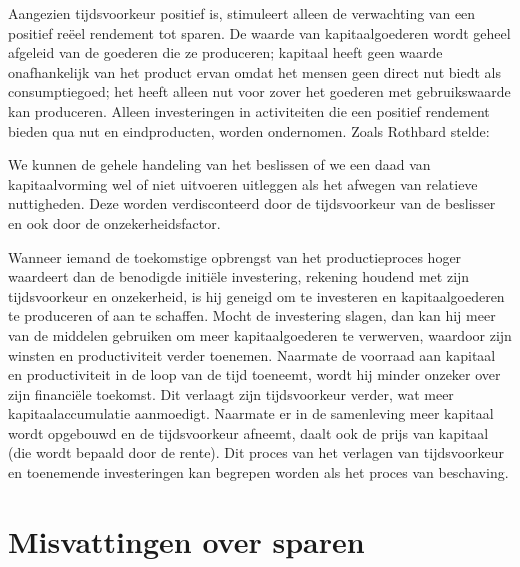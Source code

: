 Aangezien tijdsvoorkeur positief is, stimuleert alleen de verwachting van een positief reëel rendement tot sparen. De waarde van kapitaalgoederen wordt geheel afgeleid van de goederen die ze produceren; kapitaal heeft geen waarde onafhankelijk van het product ervan omdat het mensen geen direct nut biedt als consumptiegoed; het heeft alleen nut voor zover het goederen met gebruikswaarde kan produceren. Alleen investeringen in activiteiten die een positief rendement bieden qua nut en eindproducten, worden ondernomen. Zoals Rothbard stelde:

\begin{blockquotebox}
    We kunnen de gehele handeling van het beslissen of we een daad van kapitaalvorming wel of niet uitvoeren uitleggen als het afwegen van relatieve nuttigheden. Deze worden \textquotesingle verdisconteerd\textquotesingle{} door de tijdsvoorkeur van de beslisser en ook door de onzekerheidsfactor.\footnotemark
\end{blockquotebox}

Wanneer iemand de toekomstige opbrengst van het productieproces hoger waardeert dan de benodigde initiële investering, rekening houdend met zijn tijdsvoorkeur en onzekerheid, is hij geneigd om te investeren en kapitaalgoederen te produceren of aan te schaffen. Mocht de investering slagen, dan kan hij meer van de middelen gebruiken om meer kapitaalgoederen te verwerven, waardoor zijn winsten en productiviteit verder toenemen. Naarmate de voorraad aan kapitaal en productiviteit in de loop van de tijd toeneemt, wordt hij minder onzeker over zijn financiële toekomst. Dit verlaagt zijn tijdsvoorkeur verder, wat meer kapitaalaccumulatie aanmoedigt. Naarmate er in de samenleving meer kapitaal wordt opgebouwd en de tijdsvoorkeur afneemt, daalt ook de prijs van kapitaal (die wordt bepaald door de rente). Dit proces van het verlagen van tijdsvoorkeur en toenemende investeringen kan begrepen worden als het proces van beschaving.

\hypertarget{misvattingen-over-sparen}{%
\section{Misvattingen over sparen}\label{misvattingen-over-sparen}}

